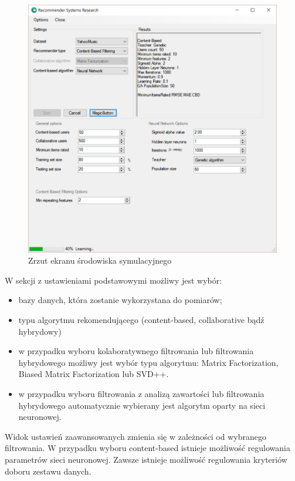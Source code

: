 \documentclass[twoside]{iisthesis}
\begin{document}
		\begin{figure}[!ht] 
			\centering
			\includegraphics[width=1\textwidth]{program}
			\caption{Zrzut ekranu środowiska symulacyjnego}
			\label{fig:program}
		\end{figure}
	
		W sekcji z ustawieniami podstawowymi możliwy jest wybór:
		\begin{itemize}
			\item bazy danych, która zostanie wykorzystana do pomiarów;
			\item typu algorytmu rekomendującego (content-based, collaborative bądź hybrydowy)
			\item w przypadku wyboru kolaboratywnego filtrowania lub filtrowania hybrydowego możliwy jest wybór typu algorytmu: Matrix Factorization, Biased Matrix Factorization lub SVD++.
			\item w przypadku wyboru filtrowania z analizą zawartości lub filtrowania hybrydowego automatycznie wybierany jest algorytm oparty na sieci neuronowej. 
		\end{itemize}
		 
		 Widok ustawień zaawansowanych zmienia się w zależności od wybranego filtrowania. W przypadku wyboru content-based istnieje możliwość regulowania parametrów sieci neuronowej. Zawsze istnieje możliwość regulowania kryteriów doboru zestawu danych.
		 
\end{document}
